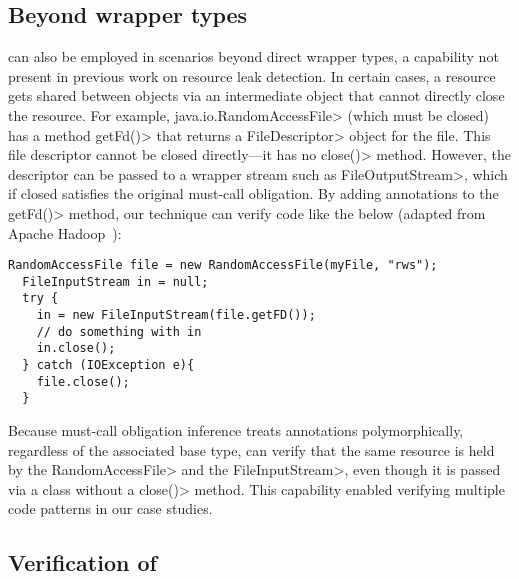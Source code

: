 
\subsection{Beyond wrapper types}

\MustCallAlias can also be employed in scenarios beyond direct wrapper types, a
capability not present in previous work on resource leak detection.  In certain cases, a resource gets
shared between objects via an intermediate object that cannot directly close the
resource.  For example, \<java.io.RandomAccessFile> (which must be closed) has
a method \<getFd()> that returns a \<FileDescriptor>
object for the file. This file
descriptor cannot be closed directly---it has no \<close()> method.
However, the descriptor can be passed to a wrapper stream such as
\<FileOutputStream>, which if closed satisfies the original must-call
obligation.  By adding \MustCallAlias annotations to the \<getFd()> method, our
technique can verify code like the below (adapted from Apache Hadoop~\cite{hadoop-random-access-file}):
\begin{lstlisting}[frame=tb,belowskip=3mm]
  RandomAccessFile file = new RandomAccessFile(myFile, "rws");
  FileInputStream in = null;
  try {
    in = new FileInputStream(file.getFD());
    // do something with in  
    in.close();
  } catch (IOException e){
    file.close();
  }
\end{lstlisting}
Because must-call obligation inference treats \MustCallAlias annotations
polymorphically, regardless of the associated base type,
\Tool can verify that the same resource is held by
the \<Random\-Access\-File> and the \<File\-Input\-Stream>, even though it
is passed via a class without a \<close()> method.
This capability enabled
verifying multiple code patterns in our case studies.

\subsection{Verification of \MustCallAlias}\label{sec:MustCallAlias-verification}

